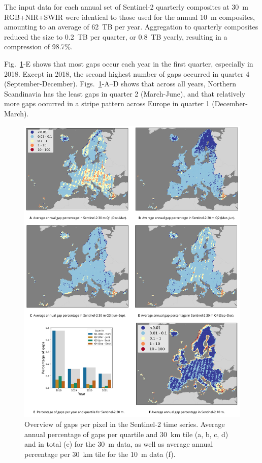 The input data for each annual set of Sentinel-2 quarterly composites at 30~m RGB+NIR+SWIR were identical to those used for the annual 10~m composites, amounting to an average of 62~TB per year. Aggregation to quarterly composites reduced the size to 0.2~TB per quarter, or 0.8~TB yearly, resulting in a compression of 98.7\%. 

Fig.\@~\ref{fig:6_gaps_sentinel}-E shows that most gaps occur each year in the first quarter, especially in 2018. Except in 2018, the second highest number of gaps occurred in quarter 4 (September-December). Figs.\@~\ref{fig:6_gaps_sentinel}-A--D shows that across all years, Northern Scandinavia has the least gaps in quarter 2 (March-June), and that relatively more gaps occurred in a stripe pattern across Europe in quarter 1 (December-March).

\begin{figure}[!hbt]
    \includegraphics[width=\linewidth]{figs_02/fig_6_gaps_sentinel.png}
    \caption{Overview of gaps per pixel in the Sentinel-2 time series. Average annual percentage of gaps per quartile and 30~km tile (a, b, c, d) and in total (e) for the 30~m data, as well as average annual percentage per 30~km tile for the 10~m data (f).}
    \label{fig:6_gaps_sentinel}
\end{figure}

